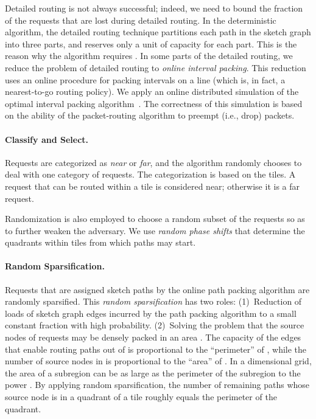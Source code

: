\documentclass[11pt]{article}
\newenvironment{proof sketch}[1]{\noindent {\emph{Proof sketch of #1:}}}{\hfill \qed}
\begin{document}
Detailed routing is not always successful; indeed, we need to bound the fraction of
the requests that are lost during detailed routing.  In the deterministic algorithm,
the detailed routing technique partitions each path in the sketch graph into three
parts, and reserves only a unit of capacity for each part. This is the reason why the
algorithm requires .  In some parts of the detailed routing, we reduce
the problem of detailed routing to \emph{online interval packing}.  This reduction
uses an online procedure for packing intervals on a line (which is, in fact, a
nearest-to-go routing policy). We apply an online distributed simulation of the
optimal interval packing algorithm~\cite{GLL}. The correctness of this simulation is
based on the ability of the packet-routing algorithm to preempt (i.e., drop) packets.

\paragraph{Classify and Select.}
Requests are categorized as \emph{near} or \emph{far}, and the algorithm randomly chooses to deal
with one category of requests.
The categorization is based on the tiles. A request that can be routed within a tile
is considered near; otherwise it is a far request.

Randomization is also employed to choose a random subset of the requests so as to
further weaken the adversary. We use \emph{random phase shifts} that determine the quadrants
within tiles from which paths may start.


\paragraph{Random Sparsification.}
Requests that are assigned
sketch paths by the online path packing algorithm are randomly sparsified. This
\emph{random sparsification} has two roles: (1)~Reduction of loads of sketch graph edges
incurred by the path packing algorithm to a small constant fraction with high
probability.  (2)~Solving the problem that the source nodes of requests may be
densely packed in an area .  The capacity of the edges that enable routing paths
out of  is proportional to the ``perimeter'' of , while the number of source
nodes in  is proportional to the ``area'' of .  In a  dimensional grid, the
area of a subregion can be as large as the perimeter of the subregion to the power
.  By applying random sparsification, the number of remaining paths whose source
node is in a quadrant of a tile roughly equals the perimeter of the quadrant.
\end{document}
